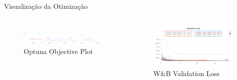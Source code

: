 \documentclass[aspectratio=169,xcolor=dvipsnames]{beamer}
\begin{document}
\begin{frame}{Visualização da Otimização}
  \begin{columns}
      \centering
      \begin{figure}
        \includegraphics[width=1\textwidth]{logos/optuna_objective_plot.png}
        \caption{Optuna Objective Plot}
      \end{figure}
      \centering
      \begin{figure}
        \includegraphics[width=1\textwidth]{logos/W&B_optimization_validation_loss.png}
        \caption{W\&B Validation Loss}
      \end{figure}
  \end{columns}
\end{frame}
\end{document}
